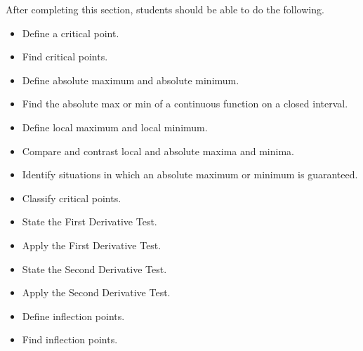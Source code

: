 \documentclass{ximera}
\title{}
\begin{document}
\begin{abstract}
\end{abstract}

\maketitle

\begin{sectionOutcomes}

After completing this section, students should be able to do the following.

\begin{itemize}
	\item Define a critical point.
	\item Find critical points.
	\item Define absolute maximum and absolute minimum.
	\item Find the absolute max or min of a continuous function on a closed interval.
	\item Define local maximum and local minimum.
	\item Compare and contrast local and absolute maxima and minima.
	\item Identify situations in which an absolute maximum or minimum is guaranteed.
	\item Classify critical points.
	\item State the First Derivative Test.
	\item Apply the First Derivative Test.
	\item State the Second Derivative Test.
	\item Apply the Second Derivative Test.
	\item Define inflection points.
	\item Find inflection points.
\end{itemize}

\end{sectionOutcomes}
\end{document}
